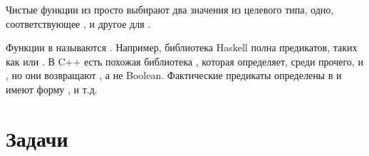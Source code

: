 Чистые функции из  просто выбирают два значения из целевого
типа, одно, соответствующее , и другое для .

Функции в  называются . Например,
библиотека Haskell  полна предикатов, таких как
 или . В C++ есть похожая библиотека
\code{}, которая определяет, среди прочего,  и
, но они возвращают , а не
Boolean. Фактические предикаты определены в  и
имеют форму ,  и т.д.

\section{Задачи}

